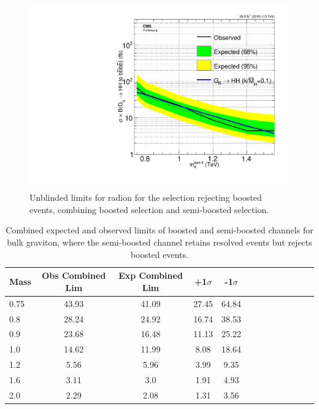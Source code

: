 \begin{figure}[thb!]
\begin{center}
\includegraphics[scale=0.5]{F5/brazilianFlag_Rad_2p11p1_HH4b2p1_HH4b2p1_13TeV.pdf}
\end{center}
\caption{Unblinded limits for radion for the selection rejecting boosted events, combining boosted selection and semi-boosted selection.}
\label{fig:1p12p1Rad}
\end{figure} 

\begin{table}[h]
\begin{tabular}{|l|c|c|c|c|c|c|c|c|c|c|c|c|}
\hline
Mass &Obs Combined Lim & Exp Combined Lim & +1$\sigma$ & -1$\sigma$\\ \hline
0.75 & 43.93 & 41.09 & 27.45 & 64.84\\
0.8 & 28.24 & 24.92 & 16.74 & 38.53\\
0.9 & 23.68 & 16.48 & 11.13 & 25.22\\
1.0 & 14.62 & 11.99 & 8.08 & 18.64\\
1.2 & 5.56 & 5.96 & 3.99 & 9.35\\
1.6 & 3.11 & 3.0 & 1.91 & 4.93\\
2.0 & 2.29 & 2.08 & 1.31 & 3.56\\
\hline
\end{tabular}
\caption{Combined expected and observed limits of boosted and semi-boosted channels for bulk graviton, where the semi-boosted channel retains resolved events but rejects boosted events.}
\label{tab:1p12p1BG}
\end{table}

